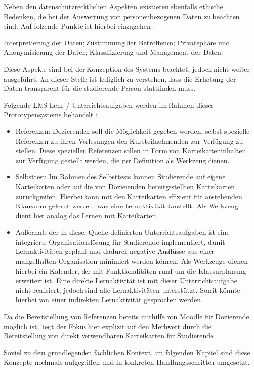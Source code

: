 Neben den datenschutzrechtlichen Aspekten existieren ebenfalls ethische Bedenken, die bei der Auswertung von personenbezogenen Daten zu beachten sind. Auf folgende Punkte ist hierbei einzugehen \autocite[S.1510]{learningAnalyticsEthicalUssuesAndDilemmas}:

	Interpretierung der Daten; Zustimmung der Betroffenen; Privatsphäre und Anonymisierung der Daten; Klassifizierung und Management der Daten.
	
Diese Aspekte sind bei der Konzeption des Systems beachtet, jedoch nicht weiter ausgeführt. An dieser Stelle ist lediglich zu verstehen, dass die Erhebung der Daten transparent für die studierende Person stattfinden muss. 
	

Folgende \ac{LMS} Lehr-/ Unterrichtsaufgaben werden im Rahmen dieses Prototypensystems behandelt \autocite[S.248]{SCHOONENBOOM2014247}:
\begin{itemize}
	\item Referenzen: Dozierenden soll die Möglichkeit gegeben werden, selbst spezielle Referenzen zu ihren Vorlesungen den Kursteilnehmenden zur Verfügung zu stellen. Diese speziellen Referenzen sollen in Form von Karteikarteninhalten zur Verfügung gestellt werden, die per Definition als Werkzeug dienen.
	\item Selbsttest: Im Rahmen des Selbsttests können Studierende auf eigene Karteikarten oder auf die von Dozierenden bereitgestellten Karteikarten zurückgreifen. Hierbei kann mit den Karteikarten effizient für anstehenden Klausuren gelernt werden, was eine Lernaktivität darstellt. Als Werkzeug dient hier analog das Lernen mit Karteikarten.
	\item Außerhalb der in dieser Quelle definierten Unterrichtsaufgaben ist eine integrierte Organisationslösung für Studierende implementiert, damit Lernaktivitäten geplant und dadurch negative Ausflüsse aus einer mangelhaften Organisation minimiert werden können.	Als Werkzeuge dienen hierbei ein Kalender, der mit Funktionalitäten rund um die Klausurplanung erweitert ist. Eine direkte Lernaktivität ist mit dieser Unterrichtsaufgabe nicht realisiert, jedoch sind alle Lernaktivitäten unterstützt. Somit könnte hierbei von einer indirekten Lernaktivität gesprochen werden.
\end{itemize}

Da die Bereitstellung von Referenzen bereits mithilfe von Moodle für Dozierende möglich ist, liegt der Fokus hier explizit auf den Merhwert durch die Bereitstellung von direkt verwendbaren Karteikarten für Studierende.

Soviel zu dem grundlegenden fachlichen Kontext, im folgenden Kapitel sind diese Konzepte nochmals aufgegriffen und in konkreten Handlungsschritten umgesetzt. 

%



